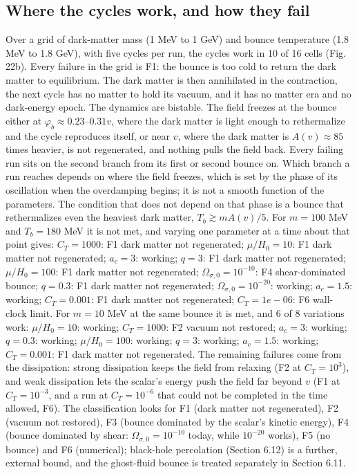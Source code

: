 \documentclass[11pt,a4paper]{article}
\begin{document}
\subsection{Where the cycles work, and how they fail}
Over a grid of dark-matter mass (1 MeV to 1 GeV) and bounce temperature (1.8 MeV to 1.8 GeV), with five cycles per run, the cycles work in 10 of 16 cells (Fig. 22b). Every failure in the grid is F1: the bounce is too cold to return the dark matter to equilibrium. The dark matter is then annihilated in the contraction, the next cycle has no matter to hold its vacuum, and it has no matter era and no dark-energy epoch. The dynamics are bistable. The field freezes at the bounce either at $\varphi_b\approx0.23$--$0.31v$, where the dark matter is light enough to rethermalize and the cycle reproduces itself, or near $v$, where the dark matter is $A(v)\approx85$ times heavier, is not regenerated, and nothing pulls the field back. Every failing run sits on the second branch from its first or second bounce on. Which branch a run reaches depends on where the field freezes, which is set by the phase of its oscillation when the overdamping begins; it is not a smooth function of the parameters. The condition that does not depend on that phase is a bounce that rethermalizes even the heaviest dark matter, $T_b\gtrsim mA(v)/5$. For $m=100$ MeV and $T_b=180$ MeV it is not met, and varying one parameter at a time about that point gives: $C_T=1000$: F1 dark matter not regenerated; $\mu/H_0=10$: F1 dark matter not regenerated; $a_c=3$: working; $q=3$: F1 dark matter not regenerated; $\mu/H_0=100$: F1 dark matter not regenerated; $\Omega_{\sigma,0}=10^{-10}$: F4 shear-dominated bounce; $q=0.3$: F1 dark matter not regenerated; $\Omega_{\sigma,0}=10^{-20}$: working; $a_c=1.5$: working; $C_T=0.001$: F1 dark matter not regenerated; $C_T=1e-06$: F6 wall-clock limit. For $m=10$ MeV at the same bounce it is met, and 6 of 8 variations work: $\mu/H_0=10$: working; $C_T=1000$: F2 vacuum not restored; $a_c=3$: working; $q=0.3$: working; $\mu/H_0=100$: working; $q=3$: working; $a_c=1.5$: working; $C_T=0.001$: F1 dark matter not regenerated. The remaining failures come from the dissipation: strong dissipation keeps the field from relaxing (F2 at $C_T=10^3$), and weak dissipation lets the scalar's energy push the field far beyond $v$ (F1 at $C_T=10^{-3}$, and a run at $C_T=10^{-6}$ that could not be completed in the time allowed, F6). The classification looks for F1 (dark matter not regenerated), F2 (vacuum not restored), F3 (bounce dominated by the scalar's kinetic energy), F4 (bounce dominated by shear: $\Omega_{\sigma,0}=10^{-10}$ today, while $10^{-20}$ works), F5 (no bounce) and F6 (numerical); black-hole percolation (Section 6.12) is a further, external bound, and the ghost-fluid bounce is treated separately in Section 6.11.
\end{document}

